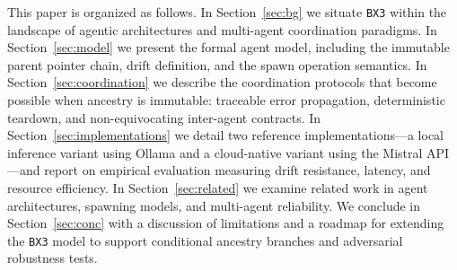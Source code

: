 This paper is organized as follows. In Section~\ref{sec:bg} we situate \texttt{BX3} within the landscape of agentic architectures and multi-agent coordination paradigms. In Section~\ref{sec:model} we present the formal agent model, including the immutable parent pointer chain, drift definition, and the spawn operation semantics. In Section~\ref{sec:coordination} we describe the coordination protocols that become possible when ancestry is immutable: traceable error propagation, deterministic teardown, and non-equivocating inter-agent contracts. In Section~\ref{sec:implementations} we detail two reference implementations---a local inference variant using Ollama and a cloud-native variant using the Mistral API---and report on empirical evaluation measuring drift resistance, latency, and resource efficiency. In Section~\ref{sec:related} we examine related work in agent architectures, spawning models, and multi-agent reliability. We conclude in Section~\ref{sec:conc} with a discussion of limitations and a roadmap for extending the \texttt{BX3} model to support conditional ancestry branches and adversarial robustness tests.
